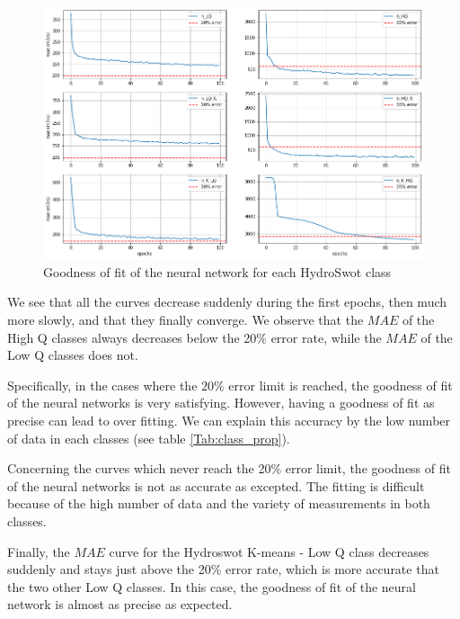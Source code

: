 \begin{figure}[H]
    \centering
    \includegraphics[scale = 0.45]{Graph/subplot_mae_h.png}
    \caption{Goodness of fit of the neural network for each HydroSwot class}
    \label{fig:subploth}
\end{figure}

We see that all the curves decrease suddenly during the first epochs, then much more slowly, and that they finally converge. We observe that the $MAE$ of the High Q classes always decreases below the 20\% error rate, while the $MAE$ of the Low Q classes does not.

Specifically, in the cases where the $20\%$ error limit is reached, the goodness of fit of the neural networks is very satisfying. However, having a goodness of fit as precise can lead to over fitting. We can explain this accuracy by the low number of data in each classes (see table \ref{Tab:class_prop}).

Concerning the curves which never reach the 20\% error limit, the goodness of fit of the neural networks is not as accurate as excepted. The fitting is difficult because of the high number of data and the variety of measurements in both classes.

Finally, the $MAE$ curve for the Hydroswot K-means - Low Q class decreases suddenly and stays just above the 20\% error rate, which is more accurate that the two other Low Q classes. In this case, the goodness of fit of the neural network is almost as precise as expected.

